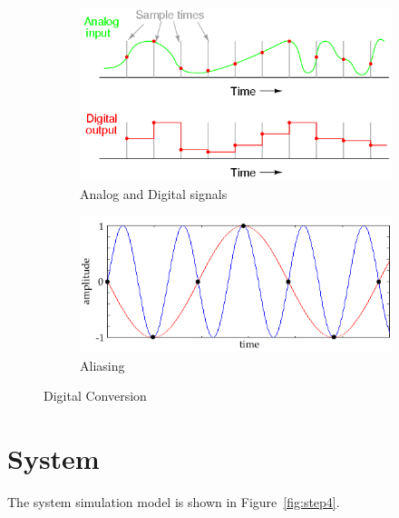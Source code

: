 \documentclass[]{article}
\begin{document}
\begin{figure}[h]
        \centering
        \begin{subfigure}[b]{0.4\textwidth}
                \includegraphics[width=\textwidth]{digitization.png}
                \caption{Analog and Digital signals}
                \label{fig:digitization}
        \end{subfigure}%
        \qquad \quad %
        \begin{subfigure}[b]{0.5\textwidth}
                \includegraphics[width=\textwidth]{aliasing.jpg}
                \caption{Aliasing \label{fig:alias}}
                \label{fig:alias}
        \end{subfigure}
        \caption{Digital Conversion \label{fig:digitize}}
\end{figure}

\newpage
\section{System}
\label{sec:system}
The system simulation model is shown in Figure~\ref{fig:step4}.  
\end{document}
